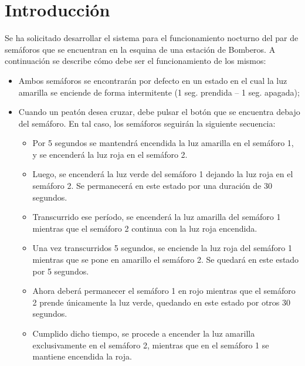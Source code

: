 \documentclass{article}
\begin{document}


\section{Introducción}
\medskip

	Se ha solicitado desarrollar el sistema para el funcionamiento nocturno del par de semáforos que se encuentran en la esquina de una estación de Bomberos. A continuación se describe cómo debe ser el funcionamiento de los mismos:
\medskip


\begin{itemize}

	\item \noindent Ambos semáforos se encontrarán por defecto en un estado en el cual la luz amarilla se enciende de forma intermitente (1 seg. prendida – 1 seg. apagada);
	
	\item \noindent Cuando un peatón desea cruzar, debe pulsar el botón que se encuentra debajo del semáforo. En tal caso, los semáforos seguirán la siguiente secuencia:

	\begin{itemize}

		\item \noindent Por 5 segundos se mantendrá encendida la luz amarilla en el semáforo 1, y se encenderá la luz roja en el semáforo 2.

		\item \noindent Luego, se encenderá la luz verde del semáforo 1 dejando la luz roja en el semáforo 2. Se permanecerá en este estado por una duración de 30 segundos.
	
		\item \noindent Transcurrido ese período, se encenderá la luz amarilla del semáforo 1 mientras que el semáforo 2 continua con la luz roja encendida.

		\item \noindent Una vez transcurridos 5 segundos, se enciende la luz roja del semáforo 1 mientras que se pone en amarillo el semáforo 2. Se quedará en este estado por 5 segundos.

		\item \noindent Ahora deberá permanecer el semáforo 1 en rojo mientras que el semáforo 2 prende únicamente la luz verde, quedando en este estado por otros 30 segundos.

		\item \noindent Cumplido dicho tiempo, se procede a encender la luz amarilla exclusivamente en el semáforo 2, mientras que en el semáforo 1 se mantiene encendida la roja.


\end{itemize}
\end{itemize}
\end{document}
